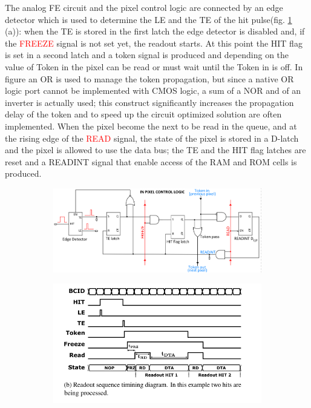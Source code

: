     The analog FE circuit and the pixel control logic are connected by an edge detector which is used to determine the LE and the TE of the hit pulse(fig. \ref{fig:readout_schematics} (a)): when the TE is stored in the first latch the edge detector is disabled and, if the \textcolor{red}{FREEZE} signal is not set yet, the readout starts. 
    At this point the HIT flag is set in a second latch and a token signal is produced and depending on the value of \textcolor{Cerulean}{Token in} the pixel can be read or must wait until the \textcolor{Cerulean}{Token in} is off. In figure an OR is used to manage the token propagation, but since a native OR logic port cannot be implemented with CMOS logic, a sum of a NOR and of an inverter is actually used; this construct significantly increases the propagation delay of the token and to speed up the circuit optimized solution are often implemented.  
    When the pixel become the next to be read in the queue, and at the rising edge of the \textcolor{red}{READ} signal, the state of the pixel is stored in a D-latch and the pixel is allowed to use the data bus; the TE and the HIT flag latches are reset and a \textcolor{Cerulean}{READINT} signal that enable access of the RAM and ROM cells is produced.
    \begin{figure}
        \begin{subfigure}{.65\textwidth}
        \centering
        \includegraphics[width=.98\linewidth]{figures/Monopix1/Monopix1_readout_schematics.png}
        \end{subfigure}%
        \begin{subfigure}{.35\textwidth}
        \centering
        \includegraphics[width=.98\linewidth]{figures/Monopix1/readout_timing.png}
        \end{subfigure}
        \caption{}
        \label{fig:readout_schematics}
    \end{figure} 
    
